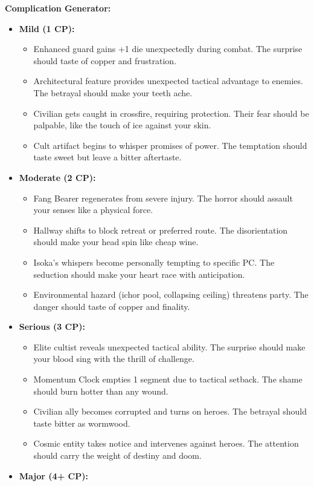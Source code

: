 \documentclass[11pt]{article}
\begin{document}
\textbf{Complication Generator:}
\begin{itemize}
\item \textbf{Mild (1 CP):} 
  \begin{itemize}
  \item Enhanced guard gains +1 die unexpectedly during combat. The surprise should taste of copper and frustration.
  \item Architectural feature provides unexpected tactical advantage to enemies. The betrayal should make your teeth ache.
  \item Civilian gets caught in crossfire, requiring protection. Their fear should be palpable, like the touch of ice against your skin.
  \item Cult artifact begins to whisper promises of power. The temptation should taste sweet but leave a bitter aftertaste.
  \end{itemize}
\item \textbf{Moderate (2 CP):}
  \begin{itemize}
  \item Fang Bearer regenerates from severe injury. The horror should assault your senses like a physical force.
  \item Hallway shifts to block retreat or preferred route. The disorientation should make your head spin like cheap wine.
  \item Isoka's whispers become personally tempting to specific PC. The seduction should make your heart race with anticipation.
  \item Environmental hazard (ichor pool, collapsing ceiling) threatens party. The danger should taste of copper and finality.
  \end{itemize}
\item \textbf{Serious (3 CP):}
  \begin{itemize}
  \item Elite cultist reveals unexpected tactical ability. The surprise should make your blood sing with the thrill of challenge.
  \item Momentum Clock empties 1 segment due to tactical setback. The shame should burn hotter than any wound.
  \item Civilian ally becomes corrupted and turns on heroes. The betrayal should taste bitter as wormwood.
  \item Cosmic entity takes notice and intervenes against heroes. The attention should carry the weight of destiny and doom.
  \end{itemize}
\item \textbf{Major (4+ CP):}

\end{itemize}
\end{document}
